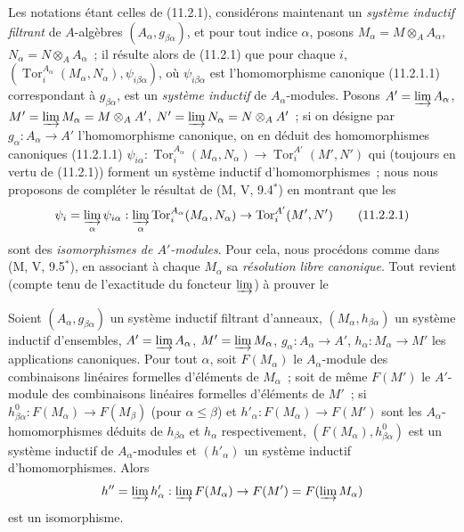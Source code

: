 \begin{env}[11.2.2]
\label{IV.11.2.2-fr}
Les notations étant celles de (11.2.1), considérons maintenant un
\emph{système inductif filtrant} de $A$-algèbres
$(A_\alpha,g_{\beta\alpha})$, et pour tout indice $\alpha$, posons
$M_\alpha=M\otimes_AA_\alpha$, $N_\alpha=N\otimes_AA_\alpha$~; il résulte
alors de (11.2.1) que pour chaque $i$,
$(\operatorname{Tor}_i^{A_\alpha}(M_\alpha,N_\alpha),
\psi_{i\beta\alpha})$, où $\psi_{i\beta\alpha}$ est l'homomorphisme
canonique (11.2.1.1) correspondant à $g_{\beta\alpha}$, est un \emph{système
inductif} de $A_\alpha$-modules. Posons
$A'=\varinjlim A_\alpha$, $M'=\varinjlim M_\alpha=M\otimes_AA'$,
$N'=\varinjlim N_\alpha=N\otimes_AA'$~; si on désigne par
$g_\alpha:A_\alpha\to A'$ l'homomorphisme canonique, on en déduit des
homomorphismes canoniques (11.2.1.1)
$\psi_{i\alpha}:\operatorname{Tor}_i^{A_\alpha}(M_\alpha,N_\alpha)
\to\operatorname{Tor}_i^{A'}(M',N')$ qui (toujours en vertu de (11.2.1))
forment un système inductif d'homomorphismes~; nous nous proposons de
compléter le résultat de (M, V, 9.4$^*$) en montrant que les
\begin{equation}
\psi_i=\varinjlim_\alpha\psi_{i\alpha}:
\varinjlim_\alpha\operatorname{Tor}_i^{A_\alpha}(M_\alpha,N_\alpha)
\to\operatorname{Tor}_i^{A'}(M',N')
\label{IV.11.2.2.1-fr}
\tag{11.2.2.1}
\end{equation}
sont des \emph{isomorphismes de $A'$-modules}. Pour cela, nous procédons
comme dans (M, V, 9.5$^*$), en associant à chaque $M_\alpha$ sa
\emph{résolution libre canonique}. Tout revient (compte tenu de l'exactitude
du foncteur $\varinjlim$) à prouver le
\end{env}


\begin{lemma}[11.2.2.2]
\label{IV.11.2.2.2-fr}
Soient $(A_\alpha,g_{\beta\alpha})$ un système inductif filtrant d'anneaux,
$(M_\alpha,h_{\beta\alpha})$ un système inductif d'ensembles,
$A'=\varinjlim A_\alpha$, $M'=\varinjlim M_\alpha$,
$g_\alpha:A_\alpha\to A'$, $h_\alpha:M_\alpha\to M'$ les applications
canoniques. Pour tout $\alpha$, soit $F(M_\alpha)$ le $A_\alpha$-module des
combinaisons linéaires formelles d'éléments de $M_\alpha$~; soit de même
$F(M')$ le $A'$-module des combinaisons linéaires formelles d'éléments de
$M'$~; si $h^0_{\beta\alpha}:F(M_\alpha)\to F(M_\beta)$ (pour
$\alpha\leq\beta$) et $h'_\alpha:F(M_\alpha)\to F(M')$ sont les
$A_\alpha$-homomorphismes déduits de $h_{\beta\alpha}$ et $h_\alpha$
respectivement, $(F(M_\alpha),h^0_{\beta\alpha})$ est un système inductif
de $A_\alpha$-modules et $(h'_\alpha)$ un système inductif
d'homomorphismes. Alors
\[
h''=\varinjlim h'_\alpha:\varinjlim F(M_\alpha)\to
F(M')=F(\varinjlim M_\alpha)
\]
est un isomorphisme.
\end{lemma}

